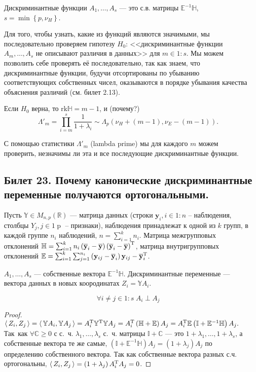 Дискриминантные функции $A_1, \ldots, A_s$ --- это с.в. матрицы $\mathbb E^{-1} \mathbb H$, $s = \min\left\lbrace p, \nu_H \right\rbrace$.

Для того, чтобы узнать, какие из функций являются значимыми, мы последовательно проверяем гипотезу $H_0$: <<дискриминантные функции $A_m, \ldots, A_s$ не описывают различия в данных>> для $m\in 1\mathbin : s$.  Мы можем позволить себе проверять её последовательно, так как знаем, что дискриминантные функции, будучи отсортированы по убыванию соответствующих собственных чисел, оказываются в порядке убывания качества объяснения различий (см. билет 2.13).

Если $H_0$ верна, то $\mathrm{rk}\mathbb H = m - 1$, и (почему?) $$\Lambda'_m = \prod_{i=m}^s \frac{1}{1+\lambda_i} \sim \Lambda_p\left(\nu_H + (m-1), \nu_E - (m-1)\right).$$

С помощью статистики $\Lambda'_m$ (lambda prime) мы для каждого $m$ можем проверить, незначимы ли эта и все последующие дискриминантные функции.

\subsection{Билет 23. Почему канонические дискриминантные переменные получаются ортогональными.}
Пусть $\mathbb Y \in M_{n, p}\left(\mathbb R\right)$ --- матрица данных (строки $\mathbf y_i, i \in 1\mathbin : n$ -- наблюдения, столбцы $Y_j, j\in 1\mathbin p$ -- признаки), 
наблюдения принадлежат к одной из $k$ групп, 
в каждой группе $n_i$ наблюдений, $n = \sum_{i=1}^k n_i$. %
Матрица межгрупповых отклонений $\mathbb H = \sum_{i=1}^k n_i\left(\overline{\mathbf y}_i - \overline{\mathbf y}\right)\left(\overline{\mathbf y}_i - \overline{\mathbf y}\right)^{\mathrm{T}}$, 
матрица внутригрупповых отклонений $\mathbb E = \sum_{i=1}^k\sum_{j=1}^{n_i} \left(\mathbf y_{ij} - \overline{\mathbf y}_i\right)\mathbf y_{ij} - \overline{\mathbf y}_i^{\mathrm{T}}$.

$A_1, \ldots, A_s$ --- собственные вектора $\mathbb E^{-1}\mathbb H$. Дискриминантные переменные --- вектора данных в новых коородинатах $Z_i = \mathbb Y A_i$.

\begin{thm}
$$\forall i \neq j \in 1\mathbin : s\; A_i \perp A_j$$
\end{thm}
\begin{proof}
$\langle\,Z_i, Z_j\,\rangle = \langle\,\mathbb Y A_i, \mathbb Y A_j\,\rangle = A_i^{\mathrm{T}}\mathbb Y^{\mathrm{T}}\mathbb Y A_j = A_i^{\mathrm{T}}\left(\mathbb H + \mathbb E\right) A_j = A_i^{\mathrm{T}}\mathbb E\left(\mathbb I + \mathbb E^{-1}\mathbb H\right) A_j.$ Так~как $\forall \mathbb C \geq 0$ с с.~ч. $\lambda_1, \ldots, \lambda_s$ с.~ч. матрицы $\mathbb I + \mathbb C$ --- это $1 + \lambda_1, \ldots, 1+ \lambda_s$, а собственные вектора те же самые, $\left(\mathbb I + \mathbb E^{-1}\mathbb H\right) A_j = \left(1 + \lambda_j\right) A_j$ по определению собственного вектора. Так как собственные вектора разных с.ч. ортогональны, $\langle\,Z_i, Z_j\,\rangle = \left(1+\lambda_j\right)A_i^{\mathrm{T}} A_j = 0$.
\end{proof}

% 